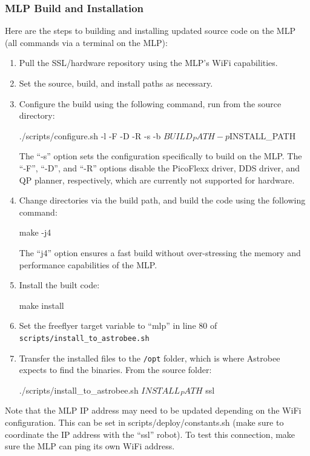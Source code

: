 \documentclass{article}
\begin{document}
\subsubsection{MLP Build and Installation}
Here are the steps to building and installing updated source code on the MLP (all commands via a terminal on the MLP):
\begin{enumerate}
    \item Pull the SSL/hardware repository using the MLP's WiFi capabilities.
    \item Set the source, build, and install paths as necessary.
    \item Configure the build using the following command, run from the source directory:
    \begin{markdown}
    ./scripts/configure.sh -l -F -D -R -s -b $BUILD_PATH -p $INSTALL_PATH
    \end{markdown}
        The ``-s'' option sets the configuration specifically to build on the MLP. The ``-F'', ``-D'', and ``-R'' options disable the PicoFlexx driver, DDS driver, and QP planner, respectively, which are currently not supported for hardware.
    \item Change directories via the build path, and build the code using the following command:
    \begin{markdown}
    make -j4
    \end{markdown}
    The ``j4'' option ensures a fast build without over-stressing the memory and performance capabilities of the MLP.
    \item Install the built code:
    \begin{markdown}
    make install
    \end{markdown}
    \item Set the freeflyer target variable to ``mlp'' in line 80 of  \texttt{scripts/install\_to\_astrobee.sh}
    \item Transfer the installed files to the \texttt{/opt} folder, which is where Astrobee expects to find the binaries. From the source folder:
    \begin{markdown}
    ./scripts/install_to_astrobee.sh $INSTALL_PATH$ ssl
    \end{markdown}
\end{enumerate}

Note that the MLP IP address may need to be updated depending on the WiFi configuration. This can be set in scripts/deploy/constants.sh (make sure to coordinate the IP address with the ``ssl'' robot). To test this connection, make sure the MLP can ping its own WiFi address.
\end{document}

